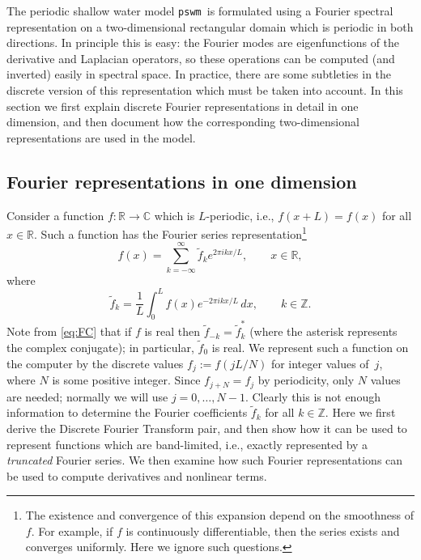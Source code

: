 \documentclass[12pt]{article}
\newcommand{\R}{\mathbb{R}}
\newcommand{\C}{\mathbb{C}}
\newcommand{\Z}{\mathbb{Z}}
\newcommand{\CC}[1]{{#1}^{*}}           %
\newcommand{\from}{\colon}                 %
\newcommand{\fc}[1]{\widetilde{#1}} %
\newcommand{\code}[1]{\texttt{#1}}
\newcommand{\pswm}{\code{pswm}}
\begin{document}
The periodic shallow water model \pswm\ is formulated using a Fourier spectral
representation  on a two-dimensional rectangular domain which is periodic in
both directions.  In principle this is easy:  the Fourier modes are
eigenfunctions of the derivative and Laplacian operators, so these operations
can be computed (and inverted) easily in spectral space.  In practice, there
are some subtleties in the discrete version of this representation which must 
be taken into account.  In this section we first explain discrete Fourier 
representations in detail in one dimension, and then document how the
corresponding two-dimensional representations are used in the model.

\pagebreak[2]
\subsection{Fourier representations in one dimension}

\newcommand{\period}{L}
Consider a function $f\from\R\to\C$ which is $\period$-periodic, i.e.,
$f(x+\period)=f(x)$ for all $x\in\R$.  Such a function has the Fourier series
representation\footnote{The existence and convergence of this expansion depend
on the smoothness of $f$.  For example, if $f$ is continuously differentiable,
then the series exists and converges uniformly.  Here we ignore such
questions.}
\begin{equation}
   f(x) = \sum_{k=-\infty}^{\infty} \fc{f}_k e^{2\pi ikx/\period},
\qquad x\in\R,
\label{eq:FS}
\end{equation}
where
\begin{equation}
   \fc{f}_k = \frac{1}{\period}\int_{0}^{\period} f(x) 
              e^{-2\pi ikx/\period} \,dx ,
\qquad k\in\Z.
\label{eq:FC}
\end{equation}
Note from \eqref{eq:FC} that if $f$ is real then $\fc{f}_{-k} = \CC{\fc{f}}_k$
(where the asterisk represents the complex conjugate); in particular,
$\fc{f}_0$ is real.  We represent such a function on the computer by the
discrete values $f_j:=f(j\period/N)$ for integer values of~$j$, where $N$ is
some positive integer.  Since $f_{j+N}=f_j$ by periodicity, only $N$ values
are needed; normally we will use $j=0,\dots,N-1$.  Clearly this is not enough
information to determine the Fourier coefficients $\fc{f}_k$ for all $k\in\Z$.
Here we first derive the Discrete Fourier Transform pair, and then show how it
can be used to represent functions which are band-limited, i.e., exactly
represented by a \emph{truncated} Fourier series.  We then examine how such
Fourier representations can be used to compute derivatives and nonlinear
terms.
\end{document}
